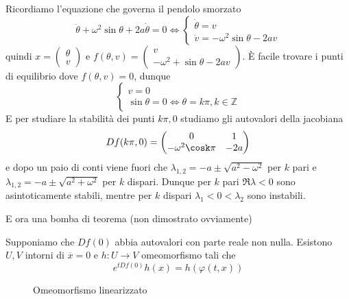 \begin{example}
    Ricordiamo l'equazione che governa il pendolo smorzato
    \[
      \ddot{\theta} + \omega^2 \sin \theta + 2a \dot{\theta} = 0 \iff 
      \begin{cases}
          \dot{\theta} = v \\
          \dot{v} = -\omega^2 \sin\theta -2av
      \end{cases}
    \]
    quindi \(x = \begin{pmatrix}
        \theta \\
        v
    \end{pmatrix}\) e \(f{(\theta, v )} = \begin{pmatrix}
        v \\
        -\omega^2 + \sin\theta -2av
    \end{pmatrix}\). È facile trovare i punti di equilibrio dove \(f{(\theta,
    v)} = 0\), dunque
    \[
      \begin{cases}
          v = 0\\
          \sin\theta = 0 \iff \theta = k\pi, k \in \mathbb{Z}
      \end{cases}
    \]
    E per studiare la stabilità dei punti \(k\pi, 0\) studiamo gli autovalori
    della jacobiana
    \[
      Df{(k\pi, 0)} = \begin{pmatrix}
          0 & 1 \\
          -\omega^2\cosk\pi & -2a
      \end{pmatrix}
    \]
    e dopo un paio di conti viene fuori che \(\lambda_{1, 2} = -a \pm \sqrt{a^2
    - \omega^2} \) per \(k\) pari e \(\lambda_{1, 2} = -a \pm \sqrt{a^2 +
    \omega^2} \) per \(k\) dispari. Dunque per \(k\) pari \(\Re \lambda < 0\)
    sono
    asintoticamente stabili, mentre per \(k\) dispari \(\lambda_{1} < 0 <
    \lambda_{2}\) sono instabili.
\end{example}

E ora una bomba di teorema (non dimostrato ovviamente)
\begin{theorem}
    Supponiamo che \(Df{(0)}\) abbia autovalori con parte reale non nulla.
    Esistono \(U, V\) intorni di \(\overline{x} = 0\) e \(h : U \to V\)
    omeomorfismo tali che 
    \[
        e^{tDf{(0)}}h{(x)} = h{(\varphi {(t, x)})}
    \]
\end{theorem}
\begin{figure}[ht]
    \centering
    \caption{Omeomorfismo linearizzato}
    \label{fig:omeomorfismo-linearizzato}
\end{figure}

